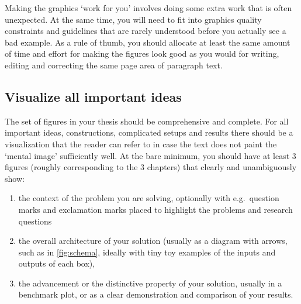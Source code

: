 Making the graphics `work for you' involves doing some extra work that is often unexpected. At the same time, you will need to fit into graphics quality constraints and guidelines that are rarely understood before you actually see a bad example. As a rule of thumb, you should allocate at least the same amount of time and effort for making the figures look good as you would for writing, editing and correcting the same page area of paragraph text.

\subsection{Visualize all important ideas}
The set of figures in your thesis should be comprehensive and complete. For all important ideas, constructions, complicated setups and results there should be a visualization that the reader can refer to in case the text does not paint the `mental image' sufficiently well. At the bare minimum, you should have at least 3 figures (roughly corresponding to the 3 chapters) that clearly and unambiguously show:
\begin{enumerate}
\item the context of the problem you are solving, optionally with e.g.~question marks and exclamation marks placed to highlight the problems and research questions
\item the overall architecture of your solution (usually as a diagram with arrows, such as in \cref{fig:schema}, ideally with tiny toy examples of the inputs and outputs of each box),
\item the advancement or the distinctive property of your solution, usually in a benchmark plot, or as a clear demonstration and comparison of your results.
\end{enumerate}

